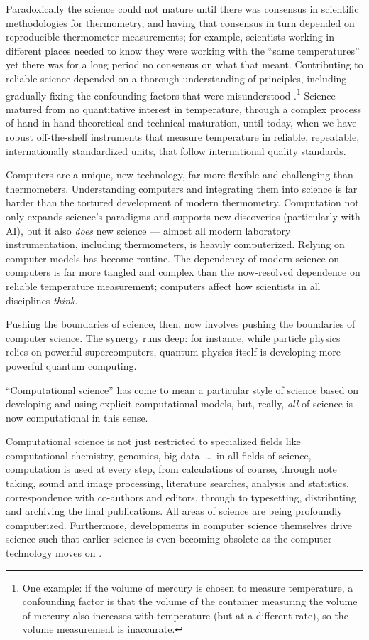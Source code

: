 \documentclass{comjnl}
\begin{document}
Paradoxically the science could not mature until there was consensus in scientific methodologies for thermometry, and having that consensus in turn depended on reproducible thermometer measurements; for example, scientists working in different places needed to know they were working with the ``same temperatures'' yet there was for a long period no consensus on what that meant. Contributing to reliable science depended on a thorough understanding of principles, including gradually fixing the confounding factors that were misunderstood \cite{temperature}.\footnote{One example: if the volume of mercury is chosen to measure temperature, a confounding factor is that the volume of the container measuring the volume of mercury also increases with temperature (but at a different rate), so the volume measurement is inaccurate.} 
Science matured from no quantitative interest in temperature, through a complex process of hand-in-hand theoretical-and-technical maturation, until today, when we have robust off-the-shelf instruments that measure temperature in reliable, repeatable, internationally standardized units, that follow international quality standards.

Computers are a unique, new technology, far more flexible and challenging than thermometers. Understanding computers and integrating them into science is far harder than the tortured development of modern thermometry. Computation not only expands science's paradigms and supports new discoveries (particularly with AI), but it also \emph{does\/} new science --- almost all modern laboratory instrumentation, including thermometers, is heavily computerized. Relying on computer models has become routine. The dependency of modern science on computers is far more tangled and complex than the now-resolved dependence on reliable temperature measurement; computers affect how scientists in all disciplines \emph{think}.

Pushing the boundaries of science, then, now involves pushing the boundaries of computer science. The synergy runs deep: for instance, while particle physics relies on powerful supercomputers, quantum physics itself is developing more powerful quantum computing.

``Computational science'' has come to mean a particular style of science based on developing and using explicit computational models, but, really, \emph{all\/} of science is now computational in this sense. 

Computational science is not just restricted to specialized fields like computational chemistry, genomics, big data~\ldots\ in all fields of science, computation is used at every step, from calculations of course, through note taking, sound and image processing, literature searches, analysis and statistics, correspondence with co-authors and editors, through to typesetting,  distributing and archiving the final publications. All areas of science are being profoundly computerized. Furthermore, developments in computer science themselves drive science such that earlier science is even becoming obsolete as the computer technology moves on \cite{form}.
\end{document}
